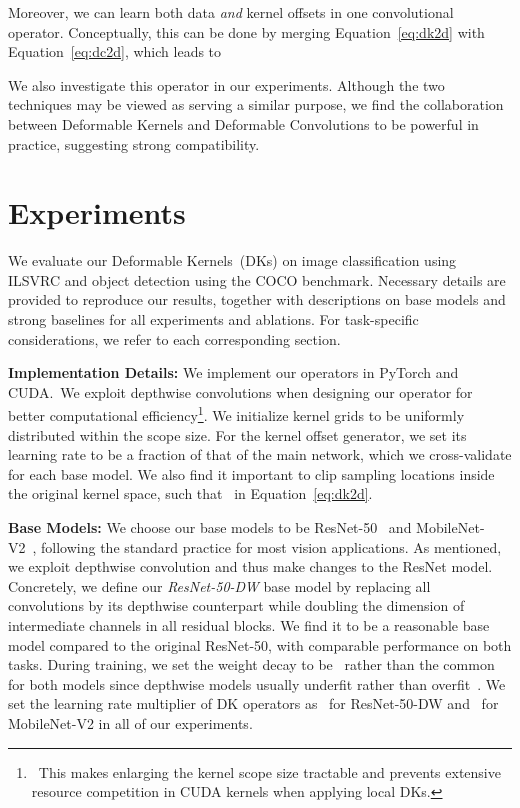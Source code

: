 \documentclass{article} \usepackage{iclr2020_conference, times}
\newcommand{\bfsection}[1]{\noindent\textbf{#1:}}
\begin{document}
Moreover, we can learn both data \textit{and} kernel offsets in one
convolutional operator.
Conceptually, this can be done by merging Equation~\ref{eq:dk2d} with
Equation~\ref{eq:dc2d}, which leads to

We also investigate this operator in our experiments.
Although the two techniques may be viewed as serving a similar
purpose, we find the collaboration between Deformable
Kernels and Deformable Convolutions to be powerful in practice, suggesting strong compatibility.
 \section{Experiments}

We evaluate our Deformable Kernels~(DKs) on image classification using ILSVRC
and object detection using the COCO benchmark.
Necessary details are provided to reproduce our results, together with
descriptions on base models and strong baselines for all experiments and
ablations.
For task-specific considerations, we refer to each corresponding section.

\bfsection{Implementation Details}
We implement our operators in PyTorch and CUDA.\
We exploit depthwise convolutions when designing our operator for better
computational efficiency\footnote{\
    This makes enlarging the kernel scope size tractable and prevents extensive
    resource competition in CUDA kernels when applying local DKs.
}.
We initialize kernel grids to be uniformly distributed within the scope size.
For the kernel offset generator, we set its learning rate to be a fraction of
that of the main network, which we cross-validate for each base model.
We also find it important to clip sampling locations inside the original kernel
space, such that~ in Equation~\ref{eq:dk2d}.

\bfsection{Base Models}
We choose our base models to be ResNet-50~\citep{he2016deep} and
MobileNet-V2~\citep{sandler2018mobilenetv2}, following the standard practice
for most vision applications.
As mentioned, we exploit depthwise convolution and thus make changes to the
ResNet model.
Concretely, we define our \textit{ResNet-50-DW} base model by replacing all~ convolutions by its depthwise counterpart while doubling the
dimension of intermediate channels in all residual blocks.
We find it to be a reasonable base model compared to the original ResNet-50,
with comparable performance on both tasks.
During training, we set the weight decay to be~ rather than
the common~ for both models since depthwise models usually underfit rather
than overfit~\citep{xie2017aggregated,howard2017mobilenets,hu2018squeeze}.
We set the learning rate multiplier of DK operators as~ for
ResNet-50-DW and~ for MobileNet-V2 in all of our experiments.
\end{document}
